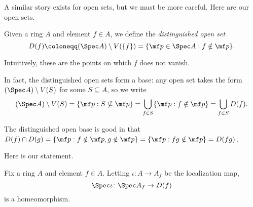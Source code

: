 \documentclass[../notes.tex]{subfiles}
\begin{document}
A similar story exists for open sets, but we must be more careful. Here are our open sets.
\begin{definition}
	Given a ring $A$ and element $f\in A$, we define the \textit{distinguished open set}
	\[D(f)\coloneqq(\Spec A)\setminus V(\{f\})=\{\mf p\in\Spec A:f\notin\mf p\}.\]
\end{definition}
Intuitively, these are the points on which $f$ does not vanish.
\begin{remark} \label{rem:distinguishedbase}
	In fact, the distinguished open sets form a base: any open set takes the form $(\Spec A)\setminus V(S)$ for some $S\subseteq A$, so we write
	\[(\Spec A)\setminus V(S)=\{\mf p:S\not\subseteq\mf p\}=\bigcup_{f\in S}\{\mf p:f\notin\mf p\}=\bigcup_{f\in S}D(f).\]
\end{remark}
\begin{remark}
	The distinguished open base is good in that $D(f)\cap D(g)=\{\mf p:f\notin\mf p,g\notin\mf p\}=\{\mf p:fg\notin\mf p\}=D(fg)$.
\end{remark}
Here is our statement.
\begin{exe} \label{exe:distinguishedisaffine}
	Fix a ring $A$ and element $f\in A$. Letting $\iota\colon A\to A_f$ be the localization map,
	\[\Spec\iota\colon\Spec A_f\to D(f)\]
	is a homeomorphism.
\end{exe}
\end{document}
